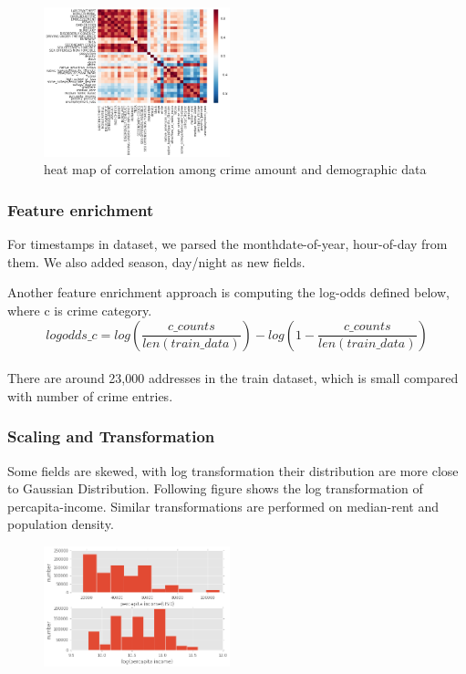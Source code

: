 \documentclass[11pt,conference]{IEEEtran}
\begin{document}
\begin{figure}[H]
\begin{center}
\includegraphics [width=0.48\textwidth]{pics/nh_category_corr.png}
\caption{heat map of correlation among crime amount and demographic data}
\end{center}
\end{figure}

\subsubsection{Feature enrichment}
For timestamps in dataset, we parsed the month\/date-of-year, hour-of-day from them. We also added season, day/night as new fields.

Another feature enrichment approach is computing the log-odds defined below, where c is crime category.
$$logodds\_c = log(\frac{c\_counts}{len(train\_data)}) - log(1 - \frac{c\_counts}{len(train\_data)})$$\\ There are around 23,000 addresses in the train dataset, which is small compared with number of crime entries. 

\subsubsection{Scaling and Transformation}
Some fields are skewed, with log transformation their distribution are more close to Gaussian Distribution. Following figure shows the log transformation of percapita-income. Similar transformations are performed on median-rent and population density.
\begin{figure}[H]
\begin{center}
\includegraphics [width=0.48\textwidth]{pics/percapita_income_log.png}
\caption{}
\end{center}
\end{figure}
\end{document}
